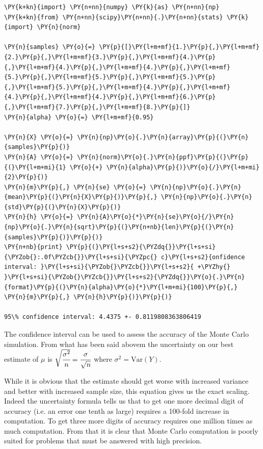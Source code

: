 \begin{codebox}
\begin{Verbatim}[commandchars=\\\{\}]
\PY{k+kn}{import} \PY{n+nn}{numpy} \PY{k}{as} \PY{n+nn}{np}
\PY{k+kn}{from} \PY{n+nn}{scipy}\PY{n+nn}{.}\PY{n+nn}{stats} \PY{k}{import} \PY{n}{norm}
	
\PY{n}{samples} \PY{o}{=} \PY{p}{[}\PY{l+m+mf}{1.}\PY{p}{,}\PY{l+m+mf}{2.}\PY{p}{,}\PY{l+m+mf}{3.}\PY{p}{,}\PY{l+m+mf}{4.}\PY{p}{,}\PY{l+m+mf}{4.}\PY{p}{,}\PY{l+m+mf}{4.}\PY{p}{,}\PY{l+m+mf}{5.}\PY{p}{,}\PY{l+m+mf}{5.}\PY{p}{,}\PY{l+m+mf}{5.}\PY{p}{,}\PY{l+m+mf}{5.}\PY{p}{,}\PY{l+m+mf}{4.}\PY{p}{,}\PY{l+m+mf}{4.}\PY{p}{,}\PY{l+m+mf}{4.}\PY{p}{,}\PY{l+m+mf}{6.}\PY{p}{,}\PY{l+m+mf}{7.}\PY{p}{,}\PY{l+m+mf}{8.}\PY{p}{]}
\PY{n}{alpha} \PY{o}{=} \PY{l+m+mf}{0.95}
	
\PY{n}{X} \PY{o}{=} \PY{n}{np}\PY{o}{.}\PY{n}{array}\PY{p}{(}\PY{n}{samples}\PY{p}{)}
\PY{n}{A} \PY{o}{=} \PY{n}{norm}\PY{o}{.}\PY{n}{ppf}\PY{p}{(}\PY{p}{(}\PY{l+m+mi}{1} \PY{o}{+} \PY{n}{alpha}\PY{p}{)}\PY{o}{/}\PY{l+m+mi}{2}\PY{p}{)}
\PY{n}{m}\PY{p}{,} \PY{n}{se} \PY{o}{=} \PY{n}{np}\PY{o}{.}\PY{n}{mean}\PY{p}{(}\PY{n}{X}\PY{p}{)}\PY{p}{,} \PY{n}{np}\PY{o}{.}\PY{n}{std}\PY{p}{(}\PY{n}{X}\PY{p}{)}
\PY{n}{h} \PY{o}{=} \PY{n}{A}\PY{o}{*}\PY{n}{se}\PY{o}{/}\PY{n}{np}\PY{o}{.}\PY{n}{sqrt}\PY{p}{(}\PY{n+nb}{len}\PY{p}{(}\PY{n}{samples}\PY{p}{)}\PY{p}{)}
\PY{n+nb}{print} \PY{p}{(}\PY{l+s+s2}{\PYZdq{}}\PY{l+s+si}{\PYZob{}:.0f\PYZcb{}}\PY{l+s+si}{\PYZpc{} c}\PY{l+s+s2}{onfidence interval: }\PY{l+s+si}{\PYZob{}\PYZcb{}}\PY{l+s+s2}{ +\PYZhy{} }\PY{l+s+si}{\PYZob{}\PYZcb{}}\PY{l+s+s2}{\PYZdq{}}\PY{o}{.}\PY{n}{format}\PY{p}{(}\PY{n}{alpha}\PY{o}{*}\PY{l+m+mi}{100}\PY{p}{,} \PY{n}{m}\PY{p}{,} \PY{n}{h}\PY{p}{)}\PY{p}{)}
	
95\% confidence interval: 4.4375 +- 0.8119808363806419
\end{Verbatim}
\end{codebox}

The confidence interval can be used to assess the accuracy of the Monte
Carlo simulation. From what has been said abovem the uncertainty on our best estimate of $\mu$ is $\sqrt{\cfrac{\sigma^2}{n}}=\cfrac{\sigma}{\sqrt{n}}$
where \(\sigma^2 = \mathrm{Var}(Y)\).

While it is obvious that the estimate should get worse with increased variance and better with increased sample size, this equation  gives us the exact 
scaling. Indeed the uncertainty formula tells us that to get one more decimal digit of accuracy (i.e. an error one tenth as large) requires a 100-fold increase in computation. To get three more digits of accuracy requires one million times as much computation. From that it is clear that Monte Carlo computation is poorly suited for problems that must be answered with high precision.

